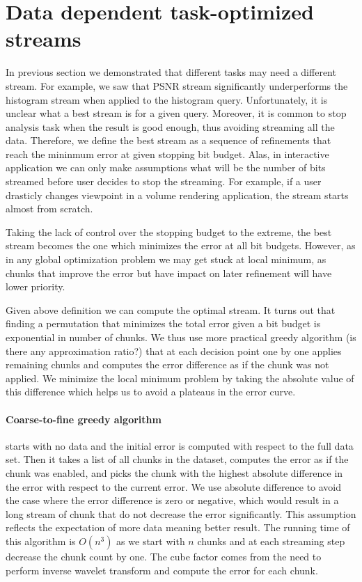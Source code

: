 \section{Data dependent task-optimized streams}

In previous section we demonstrated that different tasks may need a different stream. For example, we saw
that PSNR stream significantly underperforms the histogram stream when applied to the histogram query.
Unfortunately, it is unclear what a best stream is for a given query. Moreover, it is common to stop analysis
task when the result is good enough, thus avoiding streaming all the data. Therefore, we define the best stream as
a sequence of refinements that reach the mininmum error at given stopping bit budget. Alas, in interactive application
we can only make assumptions what will be the number of bits streamed before user decides to stop the streaming. For
example, if a user drasticly changes viewpoint in a volume rendering application, the stream starts almost from scratch.

Taking the lack of control over the stopping budget to the extreme, the best stream becomes the one which minimizes
the error at all bit budgets. However, as in any global optimization problem we may get stuck at local minimum, as
chunks that improve the error but have impact on later refinement will have lower priority.

Given above definition we can compute the optimal stream. It turns out that finding a permutation that minimizes
the total error given a bit budget is exponential in number of chunks. We thus use more practical greedy algorithm (is there
any approximation ratio?) that at each decision point one by one applies remaining chunks and computes the error
difference as if the chunk was not applied. We minimize the local minimum problem by taking the absolute value
of this difference which helps us to avoid a plateaus in the error curve.

\paragraph*{Coarse-to-fine greedy algorithm} starts with no data and the initial error is computed with respect
to the full data set. Then it takes a list of all chunks in the dataset, computes the error as if the chunk was
enabled, and picks the chunk with the highest absolute difference in the error with respect to the current error.
We use absolute difference to avoid the case where the error difference is zero or negative, which would result
in a long stream of chunk that do not decrease the error significantly. This assumption reflects the expectation
of more data meaning better result. The running time of this algorithm is $O(n^3)$ as we start with $n$ chunks
and at each streaming step decrease the chunk count by one. The cube factor comes from the need to perform inverse
wavelet transform and compute the error for each chunk.

